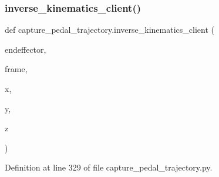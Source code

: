 \mbox{\label{namespacecapture__pedal__trajectory_affbe4020d535c4967511b40d3aef141d}} 
\subsubsection{\texorpdfstring{inverse\_kinematics\_client()}{inverse\_kinematics\_client()}}
{\footnotesize\ttfamily def capture\+\_\+pedal\+\_\+trajectory.\+inverse\+\_\+kinematics\+\_\+client (\begin{DoxyParamCaption}\item[{}]{endeffector,  }\item[{}]{frame,  }\item[{}]{x,  }\item[{}]{y,  }\item[{}]{z }\end{DoxyParamCaption})}



Definition at line 329 of file capture\+\_\+pedal\+\_\+trajectory.\+py.



